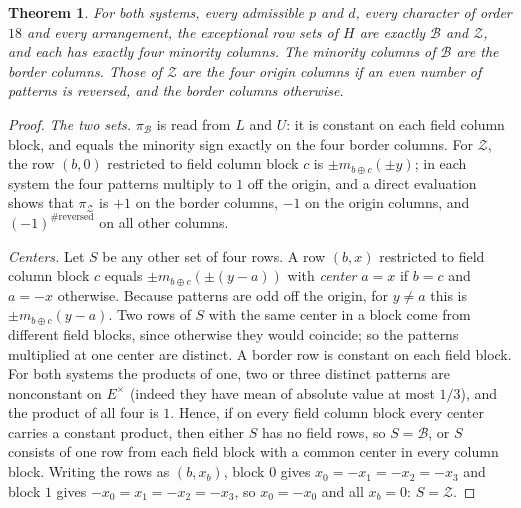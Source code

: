 \documentclass[11pt]{article}
\theoremstyle{plain}
\newtheorem{theorem}{Theorem}[section]
\theoremstyle{definition}
\theoremstyle{remark}
\begin{document}
\begin{theorem}\label{thm:quartets}
For both systems, every admissible $p$ and $d$, every character of order
$18$ and every arrangement, the exceptional row sets of $H$ are exactly
$\mathcal B$ and $\mathcal Z$, and each has exactly four minority columns.
The minority columns of $\mathcal B$ are the border columns. Those of
$\mathcal Z$ are the four origin columns if an even number of patterns is
reversed, and the border columns otherwise.
\end{theorem}

\begin{proof}
\emph{The two sets.} $\pi_{\mathcal B}$ is read from $L$ and $U$: it is
constant on each field column block, and equals the minority sign exactly on
the four border columns. For $\mathcal Z$, the row $(b,0)$ restricted to
field column block $c$ is $\pm m_{b\oplus c}(\pm y)$; in each system the four
patterns multiply to $1$ off the origin, and a direct evaluation shows that
$\pi_{\mathcal Z}$ is $+1$ on the border columns, $-1$ on the origin columns,
and $(-1)^{\#\text{reversed}}$ on all other columns.

\emph{Centers.} Let $S$ be any other set of four rows. A row $(b,x)$
restricted to field column block $c$ equals
$\pm m_{b\oplus c}(\pm(y-a))$ with \emph{center} $a=x$ if $b=c$ and
$a=-x$ otherwise. Because patterns are odd off the origin, for $y\ne a$ this
is $\pm m_{b\oplus c}(y-a)$. Two rows of $S$ with the same center in a block
come from different field blocks, since otherwise they would coincide; so the
patterns multiplied at one center are distinct. A border row is constant on
each field block. For both systems the products of one, two or three
distinct patterns are nonconstant on $E^\times$ (indeed they have mean of
absolute value at most $1/3$), and the product of all four is $1$. Hence, if
on every field column block every center carries a constant product, then
either $S$ has no field rows, so $S=\mathcal B$, or $S$ consists of one row
from each field block with a common center in every column block. Writing the
rows as $(b,x_b)$, block $0$ gives $x_0=-x_1=-x_2=-x_3$ and block $1$ gives
$-x_0=x_1=-x_2=-x_3$, so $x_0=-x_0$ and all $x_b=0$: $S=\mathcal Z$.


\end{proof}
\end{document}
